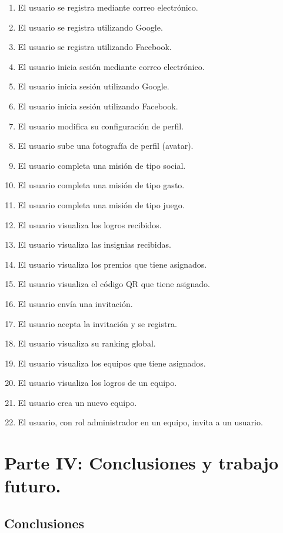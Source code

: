\documentclass[twoside]{report}
\begin{document}
\begin{enumerate}

\item El usuario se registra mediante correo electrónico.
\item El usuario se registra utilizando Google.
\item El usuario se registra utilizando Facebook.
\item El usuario inicia sesión mediante correo electrónico.
\item El usuario inicia sesión utilizando Google.
\item El usuario inicia sesión utilizando Facebook.
\item El usuario modifica su configuración de perfil.
\item El usuario sube una fotografía de perfil (avatar).
\item El usuario completa una misión de tipo social.
\item El usuario completa una misión de tipo gasto.
\item El usuario completa una misión de tipo juego.
\item El usuario visualiza los logros recibidos.
\item El usuario visualiza las insignias recibidas.
\item El usuario visualiza los premios que tiene asignados.
\item El usuario visualiza el código QR que tiene asignado.
\item El usuario envía una invitación.
\item El usuario acepta la invitación y se registra.
\item El usuario visualiza su ranking global.
\item El usuario visualiza los equipos que tiene asignados.
\item El usuario visualiza los logros de un equipo.
\item El usuario crea un nuevo equipo.
\item El usuario, con rol administrador en un equipo, invita a un usuario.
\end{enumerate}


\chapter{Parte IV: Conclusiones y trabajo futuro.}
\section{Conclusiones}
\end{document}
